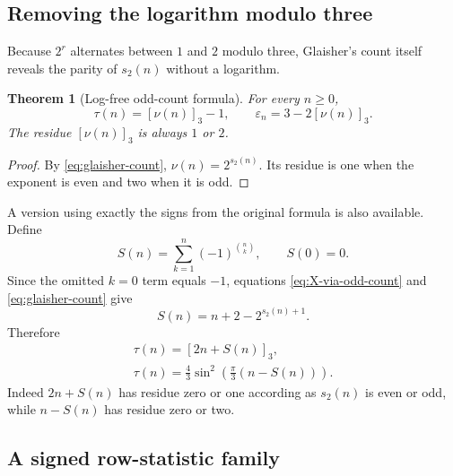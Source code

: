 \documentclass[11pt,oneside]{article}
\newtheorem{theorem}{Theorem}[section]
\theoremstyle{definition}
\theoremstyle{remark}
\newcommand{\wt}{s_2}
\newcommand{\eps}{\varepsilon}
\newcommand{\res}[2]{\left[#1\right]_{#2}}
\begin{document}
\subsection{Removing the logarithm modulo three}

Because \(2^r\) alternates between \(1\) and \(2\) modulo three, Glaisher's count itself
reveals the parity of \(\wt(n)\) without a logarithm.

\begin{theorem}[Log-free odd-count formula]
\label{thm:odd-count-mod3}
For every \(n\ge0\),
\begin{equation}
  \boxed{
  \tau(n)=\res{\nu(n)}3-1,
  \qquad
  \eps_n=3-2\res{\nu(n)}3.}                                \label{eq:odd-count-mod3}
\end{equation}
The residue \(\res{\nu(n)}3\) is always \(1\) or \(2\).
\end{theorem}

\begin{proof}
By \eqref{eq:glaisher-count}, \(\nu(n)=2^{\wt(n)}\).  Its residue is one when the exponent is
even and two when it is odd.
\end{proof}

A version using exactly the signs from the original formula is also available.  Define
\begin{equation}
  S(n)=\sum_{k=1}^{n}(-1)^{\binom nk},\qquad S(0)=0.         \label{eq:S-pascal}
\end{equation}
Since the omitted \(k=0\) term equals \(-1\), equations
\eqref{eq:X-via-odd-count} and \eqref{eq:glaisher-count} give
\begin{equation}
  S(n)=n+2-2^{\wt(n)+1}.                                    \label{eq:S-exact}
\end{equation}
Therefore
\begin{align}
  \boxed{\tau(n)=\res{2n+S(n)}3,}                           \label{eq:pascal-residue}\\
  \boxed{\tau(n)=\frac43\sin^2\!\left(\frac\pi3(n-S(n))\right).}             \label{eq:pascal-sine}
\end{align}
Indeed \(2n+S(n)\) has residue zero or one according as \(\wt(n)\) is even or odd, while
\(n-S(n)\) has residue zero or two.

\subsection{A signed row-statistic family}
\end{document}
